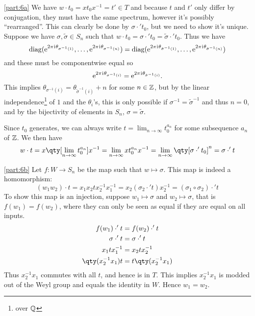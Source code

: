 \documentclass[
	pages,
	boxes,
	color=WildStrawberry
]{homework}
\begin{document}
\begin{solution}
	\ref{part:6a}
	We have $w\cdot t_0 = xt_0x^{-1} = t'\in T$ and because $t$ and $t'$ only differ by conjugation, they must have the same spectrum, however it's possibly ``rearranged''. This can clearly be done by $\sigma\cdot't_0$, but we need to show it's unique. Suppose we have $\sigma, \tilde{\sigma}\in S_n$ such that $w\cdot t_0 = \sigma\cdot't_0 = \tilde{\sigma}\cdot't_0$. Thus we have
	\begin{equation*}
		\operatorname{diag}(\mathrm{e}^{2\pi\mkern1mu\mathrm{i}\mkern1mu\theta_{\sigma^{-1}(1)}}, \ldots, \mathrm{e}^{2\pi\mkern1mu\mathrm{i}\mkern1mu\theta_{\sigma^{-1}(n)}}) = \operatorname{diag}(\mathrm{e}^{2\pi\mkern1mu\mathrm{i}\mkern1mu\theta_{\tilde{\sigma}^{-1}(1)}}, \ldots, \mathrm{e}^{2\pi\mkern1mu\mathrm{i}\mkern1mu\theta_{\tilde{\sigma}^{-1}(n)}})
	\end{equation*}
	and these must be componentwise equal so
	\begin{equation*}
		\mathrm{e}^{2\pi\mkern1mu\mathrm{i}\mkern1mu\theta_{\sigma^{-1}(i)}} = \mathrm{e}^{2\pi\mkern1mu\mathrm{i}\mkern1mu\theta_{\tilde{\sigma}^{-1}(i)}}.
	\end{equation*}
	This implies $\theta_{\sigma^{-1}(i)} = \theta_{\tilde{\sigma}^{-1}(i)} + n$ for some $n\in \mathbb{Z}$, but by the linear independence\footnote{over $\mathbb{Q}$} of $1$ and the $\theta_i$'s, this is only possible if $\sigma^{-1} = \tilde{\sigma}^{-1}$ and thus $n = 0$, and by the bijectivity of elements in $S_n$, $\sigma = \tilde{\sigma}$.

	Since $t_0$ generates, we can always write $t = \lim_{n\to\infty}t_0^{a_n}$ for some subsequence $a_n$ of $\mathbb{Z}$. We then have
	\begin{equation*}
		w\cdot t = x\qty[\lim_{n\to\infty}t_0^{a_n}]x^{-1} = \lim_{n\to\infty}xt_0^{a_n}x^{-1} = \lim_{n\to\infty}\qty[\sigma\cdot't_0]^n = \sigma\cdot' t
	\end{equation*}

	\ref{part:6b}
	Let $f: W\to S_n$ be the map such that $w\mapsto \sigma$.
	This map is indeed a homomorphism:
	\begin{equation*}
		(w_1w_2)\cdot t = x_1x_2tx_2^{-1}x_1^{-1} = x_2(\sigma_2\cdot't)x_2^{-1} = (\sigma_1\circ \sigma_2)\cdot't
	\end{equation*}
	To show this map is an injection, suppose $w_1\mapsto \sigma$ and $w_2\mapsto\sigma$, that is $f(w_1) = f(w_2)$, where they can only be seen as equal if they are equal on all inputs.
	\begin{align*}
		f(w_1)\cdot't      & = f(w_2)\cdot't      \\
		\sigma\cdot't      & = \sigma\cdot't      \\
		x_1tx_1^{-1}       & = x_2tx_2^{-1}       \\
		\qty(x_2^{-1}x_1)t & = t\qty(x_2^{-1}x_1)
	\end{align*}
	Thus $x_2^{-1}x_1$ commutes with all $t$, and hence is in $T$. This implies $x_2^{-1}x_1$ is modded out of the Weyl group and equals the identity in $W$. Hence $w_1 = w_2$.


\end{solution}
\end{document}
